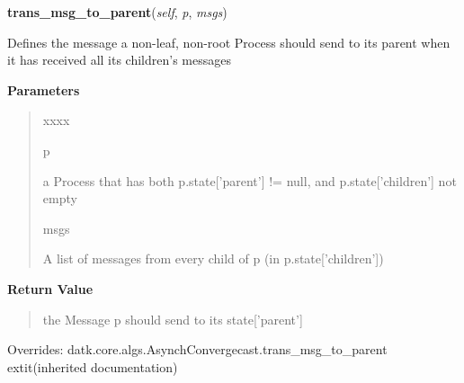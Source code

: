     \vspace{0.5ex}

\hspace{.8\funcindent}\begin{boxedminipage}{\funcwidth}

    \raggedright \textbf{trans\_msg\_to\_parent}(\textit{self}, \textit{p}, \textit{msgs})

\setlength{\parskip}{2ex}
    Defines the message a non-leaf, non-root Process should send to its 
    parent when it has received all its children's messages

\setlength{\parskip}{1ex}
      \textbf{Parameters}
      \vspace{-1ex}

      \begin{quote}
        \begin{Ventry}{xxxx}

          \item[p]

          a Process that has both p.state['parent'] != null, and 
          p.state['children'] not empty

          \item[msgs]

          A list of messages from every child of p (in p.state['children'])

        \end{Ventry}

      \end{quote}

      \textbf{Return Value}
    \vspace{-1ex}

      \begin{quote}
      the Message p should send to its state['parent']

      \end{quote}

      Overrides: datk.core.algs.AsynchConvergecast.trans\_msg\_to\_parent 	extit{(inherited documentation)}

    \end{boxedminipage}

    \vspace{0.5ex}


